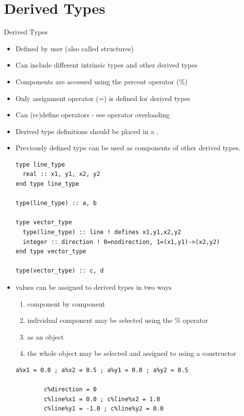 \documentclass[10pt,t]{beamer}
\begin{document}
\section{Derived Types}
\begin{frame}{Derived Types}
  \begin{itemize}
    \item Defined by user (also called structures)
    \item Can include different intrinsic types and other derived types
    \item Components are accessed using the percent operator (\%)
    \item Only assignment operator (=) is defined for derived types
    \item Can (re)define operators - see operator overloading
    \item Derived type definitions should be placed in a .
    \item Previously defined type can be used as components of other derived types.
      \begin{lstlisting}[language={[90]Fortran},basicstyle=\fontsize{5}{6}\selectfont\ttfamily]
type line_type
  real :: x1, y1, x2, y2
end type line_type

type(line_type) :: a, b

type vector_type
  type(line_type) :: line ! defines x1,y1,x2,y2
  integer :: direction ! 0=nodirection, 1=(x1,y1)->(x2,y2)
end type vector_type

type(vector_type) :: c, d
      \end{lstlisting}
    \framebreak
    \item values can be assigned to derived types in two ways
    \begin{enumerate}
      \item component by component
      \item[] individual component may be selected using the \% operator
      \item as an object
      \item[] the whole object may be selected and assigned to using a constructor
    \end{enumerate}
      \begin{lstlisting}[language={[90]Fortran},basicstyle=\fontsize{5}{6}\selectfont\ttfamily]
        a%x1 = 0.0 ; a%x2 = 0.5 ; a%y1 = 0.0 ; a%y2 = 0.5
        
        c%direction = 0 
        c%line%x1 = 0.0 ; c%line%x2 = 1.0 
        c%line%y1 = -1.0 ; c%line%y2 = 0.0


\end{lstlisting}
\end{itemize}
\end{frame}
\end{document}

